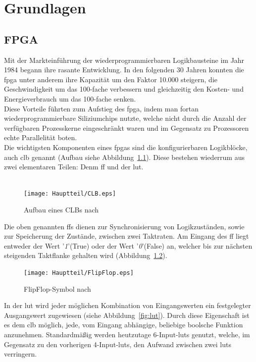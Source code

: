 
\chapter{Grundlagen}\label{kap:grundlagen}

\section{FPGA}\label{kap:fpga}
Mit der Markteinführung der wiederprogrammierbaren Logikbausteine
im Jahr 1984 begann ihre rasante Entwicklung. In den folgenden 30 Jahren konnten die \ac{fpga} unter
anderem ihre Kapazität um den Faktor 10.000 steigern, die Geschwindigkeit
um das 100-fache verbessern und gleichzeitig den Kosten- und Energieverbrauch
um das 100-fache senken. \cite{ElekPrVog}\\
Diese Vorteile führten zum Aufstieg des \ac{fpga}, indem
man fortan wiederprogrammierbare Siliziumchips nutzte, welche nicht
durch die Anzahl der verfügbaren Prozesskerne eingeschränkt waren
und im Gegensatz zu Prozessoren echte Parallelität boten. \cite{NI}\\
Die wichtigsten Komponenten eines \acp{fpga} sind die konfigurierbaren
Logikblöcke, auch \ac{clb} genannt
(Aufbau siehe Abbildung~\ref{fig:CLB}). Diese bestehen wiederrum aus zwei
 elementaren Teilen: Denm \ac{ff} und der \ac{lut}.\\\\

\begin{figure}[h]
\centering
\texttt{[image: Hauptteil/CLB.eps]}
\caption{Aufbau eines CLBs nach \cite{VeniWiki}}
\label{fig:CLB}
\end{figure}

\newpage
Die oben genannten \aclp{ff} dienen zur Synchronisierung von Logikzuständen,
sowie zur Speicherung der Zustände, zwischen zwei Taktraten.
Am Eingang des \acl{ff} liegt entweder der Wert '\emph{1}'(True) oder
der Wert '\emph{0}'(False) an, welcher bis zur nächsten steigenden Taktflanke
gehalten wird (Abbildung~\ref{fig:ff}). \cite{NI}\\

\begin{figure}[h]
\centering
\texttt{[image: Hauptteil/FlipFlop.eps]}
\caption{FlipFlop-Symbol nach \cite{NI}}
\label{fig:ff}
\end{figure}


In der \ac{lut} wird jeder möglichen Kombination von Eingangswerten ein festgelegter Ausgangswert
zugewiesen (siehe Abbildung~\ref{fig:lut}).
Durch diese Eigenschaft ist es dem \ac{clb} möglich, jede, vom Eingang abhängige, beliebige boolsche Funktion anzunehmen.
Standardmäßig werden heutzutage 6-Input-\acp{lut} genutzt, welche, im Gegensatz zu den vorherigen 4-Input-\acp{lut},
den Aufwand zwischen zwei \acp{lut} verringern.\cite{mikro}\\

